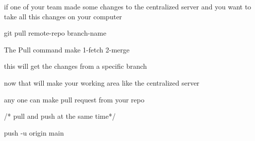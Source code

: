if one of your team made some changes to the centralized server 
and you want to take all this changes on your computer 

git pull remote-repo  branch-name 

The Pull command 
make 1-fetch 2-merge 


this will get the changes from a specific branch

now that will make your working area like the centralized server 

any one can make pull request from your repo  

/*  pull and push at the same time*/

push -u origin main 